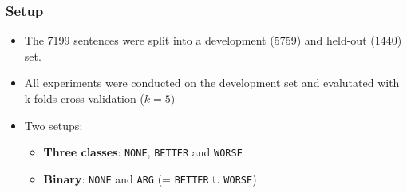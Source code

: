 \documentclass[11pt,aspectratio=169,usenames,dvipsnames]{beamer}
\begin{document}
    
        \begin{frame}[t]
        \frametitle{Setup}
        \begin{itemize}
            \item The 7199 sentences were split into a development (5759) and held-out (1440) set.
            \item All experiments were conducted on the development set and evalutated with k-folds cross validation ($k = 5$)\pause
            \item Two setups: 
            \begin{itemize}
            \item \textbf{Three classes}: \texttt{NONE}, \texttt{BETTER} and \texttt{WORSE}
            \item\textbf{Binary}: \texttt{NONE} and \texttt{ARG} (= \texttt{BETTER} $\cup$ \texttt{WORSE})
            \end{itemize}
        \end{itemize}

    \end{frame}

    
    
\end{document}
